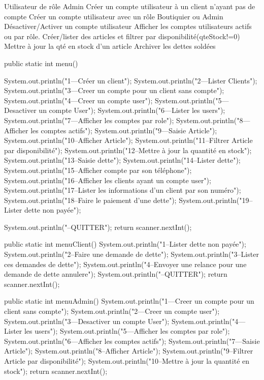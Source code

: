 Utilisateur de rôle Admin
Créer un compte utilisateur à un client n’ayant pas de compte
Créer un compte utilisateur avec un rôle Boutiquier ou  Admin
Désactiver/Activer  un compte utilisateur  
Afficher les comptes utilisateurs  actifs ou par rôle.
Créer/lister  des articles et filtrer par disponibilité(qteStock!=0) 
Mettre à jour la qté en stock d’un article
Archiver les dettes soldées



public static int menu() {
    System.out.println("1---Créer un client");
    System.out.println("2---Lister Clients");
    System.out.println("3---Creer un compte pour un client sans compte");
    System.out.println("4---Creer un compte user");
    System.out.println("5---Desactiver un compte User");
    System.out.println("6---Lister les users");
    System.out.println("7---Afficher les comptes par role");
    System.out.println("8---Afficher les comptes actifs");
    System.out.println("9---Saisie Article");
    System.out.println("10--Afficher Article");
    System.out.println("11--Filtrer Article par disponibilité");
    System.out.println("12--Mettre à jour la quantité en stock");
    System.out.println("13--Saisie dette");
    System.out.println("14--Lister dette");
    System.out.println("15--Afficher compte par son téléphone");
    System.out.println("16--Afficher les clients ayant un compte  user");
    System.out.println("17--Lister les informations d'un client par son numéro");
    System.out.println("18--Faire le paiement d'une dette");
    System.out.println("19--Lister dette non payée");

    System.out.println("--QUITTER");
    return scanner.nextInt();
}

public static int menuClient() {
    System.out.println("1--Lister dette non payée");
    System.out.println("2--Faire une demande de dette");
    System.out.println("3--Lister ces demandes de dette");
    System.out.println("4--Envoyer une relance pour une  demande de dette annulere");
    System.out.println("--QUITTER");
    return scanner.nextInt();
}

public static int menuAdmin() {
    System.out.println("1---Creer un compte pour un client sans compte");
    System.out.println("2---Creer un compte user");
    System.out.println("3---Desactiver un compte User");
    System.out.println("4---Lister les users");
    System.out.println("5---Afficher les comptes par role");
    System.out.println("6---Afficher les comptes actifs");
    System.out.println("7---Saisie Article");
    System.out.println("8--Afficher Article");
    System.out.println("9--Filtrer Article par disponibilité");
    System.out.println("10--Mettre à jour la quantité en stock");
    return scanner.nextInt();
}

